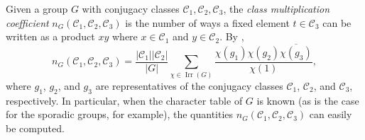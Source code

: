 \documentclass[11pt,a4paper]{amsart}
\theoremstyle{plain}
\theoremstyle{definition}
\theoremstyle{remark}
\theoremstyle{remark}
\theoremstyle{remark}
\theoremstyle{definition}
\DeclareMathOperator{\Irr}{Irr}
\begin{document}
Given a group $G$ with conjugacy classes $\mathcal{C}_1,\mathcal{C}_2,\mathcal{C}_3$, the \emph{class multiplication coefficient} $n_G(\mathcal{C}_1,\mathcal{C}_2,\mathcal{C}_3)$ is the number of ways a fixed element $t\in \mathcal{C}_3$ can be written as a product $xy$ where $x\in\mathcal{C}_1$ and $y\in \mathcal{C}_2$. By \cite[Theorem 4.2.12]{Gorenstein}, 
\[n_G({\mathcal{C}_1,\mathcal{C}_2,\mathcal{C}_3})
=\frac{|\mathcal{C}_1||\mathcal{C}_2|}{|G|}\sum_{\chi\in\Irr(G)}\frac{\chi(g_1)\chi(g_2)\overline{\chi(g_3)}}{\chi(1)},\]
where $g_1$, $g_2$, and $g_3$ are representatives of the conjugacy classes $\mathcal{C}_1$, $\mathcal{C}_2$, and $\mathcal{C}_3$, respectively. In particular, when the character table of $G$ is known (as is the case for the sporadic groups, for example), the quantities $n_G(\mathcal{C}_1,\mathcal{C}_2,\mathcal{C}_3)$ can easily be computed.
\end{document}
